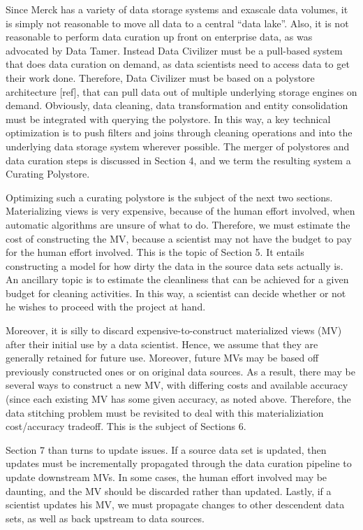 Since Merck has a variety of data storage systems and exascale data volumes, it
is simply not reasonable to move all data to a central “data lake”.  Also, it is
not reasonable to perform data curation up front on enterprise data, as was
advocated by Data Tamer.  Instead Data Civilizer must be a pull-based system
that does data curation on demand, as data scientists need to access data to get
their work done.  Therefore, Data Civilizer must be based on a polystore
architecture [ref], that can pull data out of multiple underlying storage
engines on demand.  Obviously, data cleaning, data transformation and entity
consolidation must be integrated with querying the polystore.  In this way, a
key technical optimization is to push filters and joins through cleaning
operations and into the underlying data storage system wherever possible.  The
merger of polystores and data curation steps is discussed in Section 4, and we
term the resulting system a Curating Polystore.  

Optimizing such a curating polystore is the subject of the next two sections.
Materializing views is very expensive, because of the human effort involved,
when automatic algorithms are unsure of what to do.  Therefore, we must estimate
the cost of constructing the MV, because a scientist may not have the budget to
pay for the human effort involved.  This is the topic of Section 5.  It entails
constructing a model for how dirty the data in the source data sets actually is.
An ancillary topic is to estimate the cleanliness that can be achieved for a
given budget for cleaning activities.  In this way, a scientist can decide
whether or not he wishes to proceed with the project at hand.

Moreover, it is silly to discard expensive-to-construct materialized views (MV)
after their initial use by a data scientist.  Hence, we assume that they are
generally retained for future use.  Moreover, future MVs may be based off
previously constructed ones or on original data sources.  As a result, there may
be several ways to construct a new MV, with differing costs and available
accuracy (since each existing MV has some given accuracy, as noted above.
Therefore, the data stitching problem must be revisited to deal with this
materializiation cost/accuracy tradeoff.  This is the subject of Sections 6.

Section 7 than turns to update issues.   If a source data set is updated, then
updates must be incrementally propagated through the data curation pipeline to
update downstream MVs.  In some cases, the human effort involved may be
daunting, and the MV should be discarded rather than updated.  Lastly, if a
scientist updates his MV, we must propagate changes to other descendent data
sets, as well as back upstream to data sources. 

